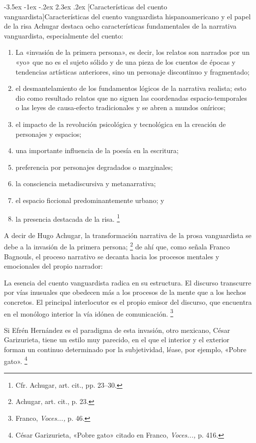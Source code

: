 \documentclass[14pt,twoside,final]{extbook} %
\makeatletter
\let\oldfootnote\footnote
\renewcommand\footnote[1]{%
\oldfootnote{\hspace{1mm}#1}}
\renewcommand\section{\@startsection {section}{1}{\z@}%
                                     {-3.5ex \@plus -1ex \@minus -.2ex}%
                                     {2.3ex \@plus .2ex}%
                                     {\normalfont\large\bfseries\sc}}
\makeatother
\begin{document}
\section[Características del cuento vanguardista]{Características del cuento vanguardista hispanoamericano y el papel de la risa}\label{sec:caracteristicas-del-cuento-vanguardista-hispanoamericano-y-el-papel-de-la-risa}\protect\enlargethispage*{\baselineskip}
Achugar destaca ocho características fundamentales de la narrativa vanguardista, especialmente del cuento:
\begin{enumerate}[noitemsep]
\item La «invasión de la primera persona», es decir, los relatos son narrados por un «yo» que no es el sujeto sólido y de una pieza de los cuentos de épocas y tendencias artísticas anteriores, sino un personaje discontinuo y fragmentado;
\item el desmantelamiento de los fundamentos lógicos de la narrativa realista; esto dio como resultado relatos que no siguen las coordenadas espacio-temporales o las leyes de causa-efecto tradicionales y se abren a mundos oníricos;
\item el impacto de la revolución psicológica y tecnológica en la creación de personajes y espacios;
\item una importante influencia de la poesía en la escritura;
\item preferencia por personajes degradados o marginales;
\item la consciencia metadiscursiva y metanarrativa;
\item el espacio ficcional predominantemente urbano; y
\item la presencia destacada de la risa.\footnote{Cfr. Achugar, art. cit., pp. 23--30.}
\end{enumerate}
A decir de Hugo Achugar, la transformación narrativa de la prosa vanguardista se debe a la invasión de la primera persona;\footnote{Achugar, art. cit., p. 23.} de ahí que, como señala Franco Bagnouls, el proceso narrativo se decanta hacia los procesos mentales y emocionales del propio narrador: 
\begin{quoting}
La esencia del cuento vanguardista radica en su estructura. El discurso transcurre por vías inusuales que obedecen más a los procesos de la mente que a los hechos concretos. El principal interlocutor es el propio emisor del discurso, que encuentra en el monólogo interior la vía idónea de comunicación.\footnote{Franco, \emph{Voces...,} p. 46.}
\end{quoting}
Si Efrén Hernández es el paradigma de esta invasión, otro mexicano, César Garizurieta, tiene un estilo muy parecido, en el que el interior y el exterior forman un continuo determinado por la subjetividad, léase, por ejemplo, «Pobre gato».\footnote{César Garizurieta, «Pobre gato» citado en Franco, \emph{Voces...,} p. 416.}
\end{document}
